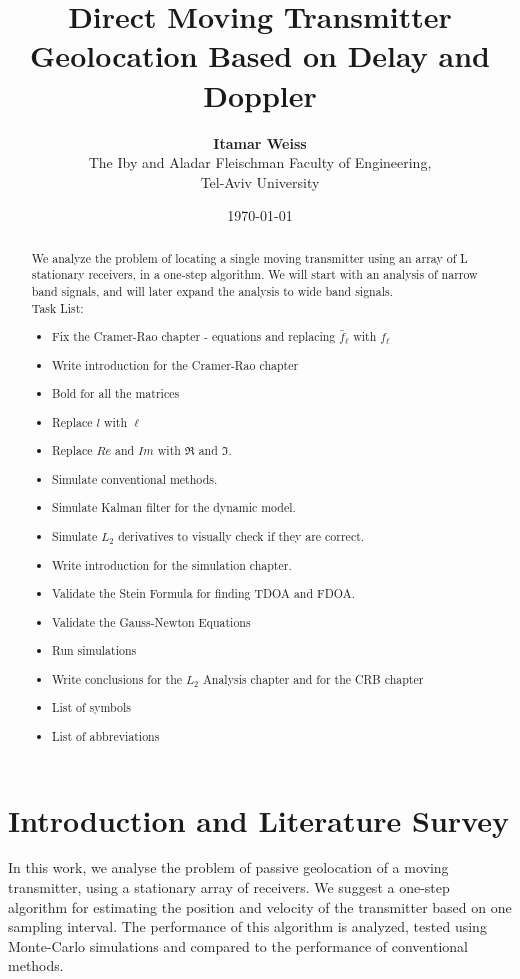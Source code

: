 \documentclass[10pt,a4paper]{report}
\begin{document}
\title{Direct Moving Transmitter Geolocation Based on Delay and Doppler}
\author{\textbf{Itamar Weiss}\\
  The Iby and Aladar Fleischman Faculty of Engineering,\\
  Tel-Aviv University}  
\date{\today}
\maketitle

\begin{abstract}
We analyze the problem of locating a single moving transmitter using an array of L stationary receivers, in a one-step algorithm. We will start with an analysis of narrow band signals, and will later expand the analysis to wide band signals.\\

Task List:
\begin{itemize}
\item Fix the Cramer-Rao chapter - equations and replacing $\tilde{f_\ell}$ with $f_\ell$
\item Write introduction for the Cramer-Rao chapter
\item Bold for all the matrices
\item Replace $l$ with $\ell$
\item Replace $Re$ and $Im$ with $\Re$ and $\Im$.
\item Simulate conventional methods.
\item Simulate Kalman filter for the dynamic model.
\item Simulate $L_2$ derivatives to visually check if they are correct.
\item Write introduction for the simulation chapter.
\item Validate the Stein Formula for finding TDOA and FDOA.
\item Validate the Gauss-Newton Equations
\item Run simulations
\item Write conclusions for the $L_2$ Analysis chapter and for the CRB chapter
\item List of symbols
\item List of abbreviations
\end{itemize}
\end{abstract}

\tableofcontents

\listoffigures

\chapter{Introduction and Literature Survey}
In this work, we analyse the problem of passive geolocation of a moving transmitter, using
a stationary array of receivers. We suggest a one-step algorithm for estimating the position and velocity of the transmitter based on one sampling interval. The performance of this algorithm is analyzed, tested using Monte-Carlo simulations and compared to the performance of conventional methods.\\
\end{document}
